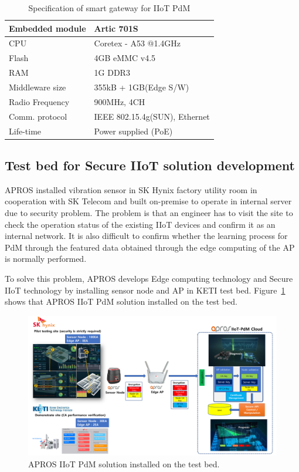 \documentclass[11pt]{article}
\begin{document}
\begin{table}[]
\centering
\begin{tabular}{l|l}
\hline
Embedded module& Artic 701S\\ \hline
CPU & Coretex - A53 @1.4GHz\\ \hline
Flash & 4GB eMMC v4.5\\ \hline
RAM & 1G DDR3\\ \hline
Middleware size & 355kB + 1GB(Edge S/W)\\ \hline
Radio Frequency & 900MHz, 4CH\\ \hline
Comm. protocol & IEEE 802.15.4g(SUN), Ethernet\\ \hline
Life-time & Power supplied (PoE)\\ \hline
\end{tabular}
\caption{Specification of smart gateway for IIoT PdM}
\label{tab:smartgateway}
\end{table}

\subsection{Test bed for Secure IIoT solution development}

APROS installed vibration sensor in SK Hynix factory utility room in cooperation with SK Telecom and built on-premise to operate in internal server due to security problem. The problem is that an engineer has to visit the site to check the operation status of the existing IIoT devices and confirm it as an internal network. It is also difficult to confirm whether the learning process for PdM through the featured data obtained through the edge computing of the AP is normally performed.

To solve this problem, APROS develops Edge computing technology and Secure IIoT technology by installing sensor node and AP in KETI test bed. Figure~\ref{fig:apros-pdm-test-bed} shows that APROS IIoT PdM solution installed on the test bed.

\begin{figure}[!ht]
\centering
\includegraphics[width=1\textwidth]{demonstrate_site_with_security_IIoT-PdM_diagram.pdf}
\caption{APROS IIoT PdM solution installed on the test bed.}
\label{fig:apros-pdm-test-bed}
\end{figure}
\end{document}
